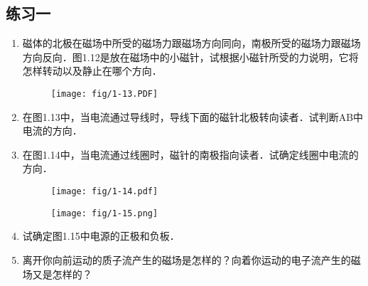 \subsection*{练习一}
\begin{enumerate}
    \item 磁体的北极在磁场中所受的磁场力跟磁场方向同向，南极所受的磁场力跟磁场方向反向．图1.12是放在磁场中的小磁针，试根据小磁针所受的力说明，它将怎样转动以及静止在哪个方向．
\begin{figure}[htp]
\centering
\begin{minipage}[t]{0.48\textwidth}
\centering
{}
\caption{}
\end{minipage}
\begin{minipage}[t]{0.48\textwidth}
\centering
\texttt{[image: fig/1-13.PDF]}
\caption{}
\end{minipage}
\end{figure}
    \item 在图1.13中，当电流通过导线时，导线下面的磁针北极转向读者．试判断AB中电流的方向．
    \item 在图1.14中，当电流通过线圈时，磁针的南极指向读者．试确定线圈中电流的方向．
\begin{figure}[htp]
\centering
\begin{minipage}[t]{0.48\textwidth}
\centering
\texttt{[image: fig/1-14.pdf]}
\caption{}
\end{minipage}
\begin{minipage}[t]{0.48\textwidth}
\centering
\texttt{[image: fig/1-15.png]}
\caption{}
\end{minipage}
\end{figure}

    \item 试确定图1.15中电源的正极和负板．
    \item 离开你向前运动的质子流产生的磁场是怎样的？向着你运动的电子流产生的磁场又是怎样的？
\end{enumerate}

